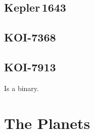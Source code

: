 \documentclass[12pt,twocolumn,linenumbers]{aastex63}
\begin{document}
\subsection{Kepler\,1643}
\subsection{KOI-7368}
\subsection{KOI-7913}
Is a binary.

\section{The Planets}
\label{sec:planets}
\end{document}
